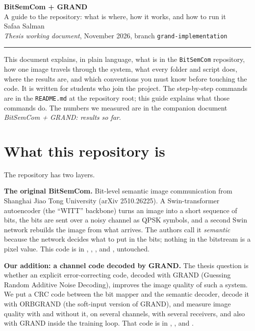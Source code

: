 \documentclass{article}
\begin{document}
\begin{center}
{\LARGE \bfseries \color{deepred} BitSemCom + GRAND}\\[2pt]
{\large \color{deepred} A guide to the repository: what is where, how it works, and how to run it}\\[6pt]
{\normalsize Safaa Salman}\\[2pt]
{\small \emph{Thesis working document}, November 2026, branch \texttt{grand-implementation}}
\end{center}

\vspace{4pt}
\hrule
\vspace{8pt}

\begin{conceptbox}[title=What this document is]
This document explains, in plain language, what is in the \texttt{BitSemCom} repository, how one image
travels through the system, what every folder and script does, where the results are, and which
conventions you must know before touching the code. It is written for students who join the project.
The step-by-step commands are in the \texttt{README.md} at the repository root; this guide explains
what those commands do. The numbers we measured are in the companion document
\emph{BitSemCom + GRAND: results so far}.
\end{conceptbox}

\tableofcontents

\section{What this repository is}

The repository has two layers.

\textbf{The original BitSemCom.} Bit-level semantic image communication from Shanghai Jiao Tong University
(arXiv 2510.26225). A Swin-transformer autoencoder (the ``WITT'' backbone) turns an image into a short
sequence of bits, the bits are sent over a noisy channel as QPSK symbols, and a second Swin network
rebuilds the image from what arrives. The authors call it \emph{semantic} because the network decides
what to put in the bits; nothing in the bitstream is a pixel value. This code is in ,
, ,  and , untouched.

\textbf{Our addition: a channel code decoded by GRAND.} The thesis question is whether an explicit
error-correcting code, decoded with GRAND (Guessing Random Additive Noise Decoding), improves the image
quality of such a system. We put a CRC code between the bit mapper and the semantic decoder, decode it
with ORBGRAND (the soft-input version of GRAND), and measure image quality with and without it, on
several channels, with several receivers, and also with GRAND inside the training loop. That code is in
, ,  and .
\end{document}
